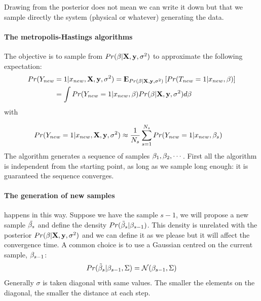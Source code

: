 Drawing from the posterior does not mean we can write it down but that we sample directly the system (physical or whatever) generating the data.

\paragraph{The metropolis-Hastings algorithms}
The objective is to sample from $Pr(\mathbf{\beta}|\mathrm{\mathbf{X}},\mathbf{y},\sigma^2)$ to approximate the following expectation:
\begin{equation}
\begin{aligned}
Pr(Y_{new}&=1|x_{new},\mathrm{\mathbf{X}},\mathbf{y},\sigma^2) = {\rm I\kern-.3em E}_{Pr(\mathbf{\beta}|\mathrm{\mathbf{X}},\mathbf{y},\sigma^2)}\left[Pr(T_{new}=1|x_{new},\mathbf{\beta}) \right] \\
&=\int Pr(Y_{new}=1|x_{new},\mathbf{\beta})Pr(\mathbf{\beta}|\mathrm{\mathbf{X}},\mathbf{y},\sigma^2) d\mathbf{\beta}
\end{aligned}
\end{equation}
with 

\begin{equation}
\begin{aligned}
Pr(Y_{new}&=1|x_{new},\mathrm{\mathbf{X}},\mathbf{y},\sigma^2) \approx \frac{1}{N_s}\sum_{s=1}^{N_s} Pr(Y_{new}=1|x_{new}, \mathbf{\beta}_s)
\end{aligned}
\end{equation}
The algorithm generates a sequence of samples $\mathbf{\beta}_1, \mathbf{\beta}_2, \cdots$. First all the algorithm is independent from the starting point, as long as we sample long enough: it is guaranteed the sequence converges.
\paragraph{\textbf{The generation of new samples}} happens in this way. Suppose we have the sample $s-1$, we will propose a new sample $\tilde{\mathbf{\beta}_s}$ and define the density $Pr(\tilde{\mathbf{\beta}}_s|\mathbf{\beta}_{s-1})$. This density is unrelated with the posterior $Pr(\mathbf{\beta}|\mathrm{\mathbf{X}},\mathbf{y},\sigma^2)$ and we can define it as we please but it will affect the convergence time. A common choice is to use a Gaussian centred on the current sample, $\mathbf{\beta}_{s-1}$:
\begin{equation}
Pr(\tilde{\be}_s|\be_{s-1}, \Sigma) =\CMcal{N}(\be_{s-1}, \Sigma)
\end{equation}
Generally $\sigma$ is taken diagonal with same values. The smaller the elements on the diagonal, the smaller the distance at each step.

